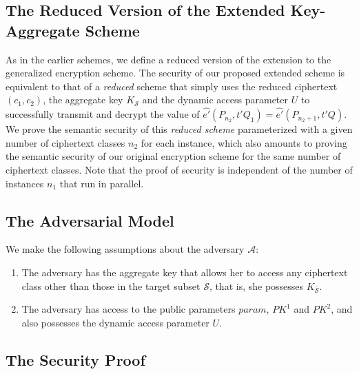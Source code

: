 \subsection{The Reduced Version of the Extended Key-Aggregate Scheme}

As in the earlier schemes, we define a reduced version of the extension to the generalized encryption scheme. The security of our proposed extended scheme is equivalent to that of a \emph{reduced} scheme that simply uses the reduced ciphertext $(c_1,c_2)$, the aggregate key $K_{\mathcal{S}}$ and the dynamic access parameter $U$ to successfully transmit and decrypt the value of $\hat{e'}(P_{n_2},t'Q_1)=\hat{e'}(P_{n_2+1},t'Q)$. We prove the semantic security of this \emph{reduced scheme} parameterized with a given number of ciphertext classes $n_2$ for each instance, which also amounts to proving the semantic security of our original encryption scheme for the same number of ciphertext classes. Note that the proof of security is independent of the number of instances $n_1$ that run in parallel.

\subsection{The Adversarial Model} We make the following assumptions about the adversary $\mathcal{A}$:

\begin{enumerate}
 \item The adversary has the aggregate key that allows her to access any ciphertext class other than those in the target subset $\mathcal{S}$, that is, she possesses $K_{\overline{\mathcal{S}}}$.
 \item The adversary has access to the public parameters $param$, $PK^1$ and $PK^2$, and also possesses the dynamic access parameter $U$.
\end{enumerate}


\subsection{The Security Proof}


